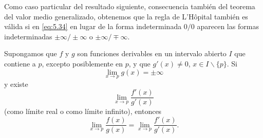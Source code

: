 \documentclass[12pt,a4paper]{book}
\begin{document}
    Como caso particular del resultado siguiente, consecuencia también del
    teorema del valor medio generalizado, obtenemos que la regla de L'Hôpital
    también es válida si en \eqref{eq:5.34} en lugar de la forma indeterminada $0/0$ aparecen
    las formas indeterminadas $\pm\infty/\pm\infty$ o $\pm\infty/\mp\infty$.

    \begin{proposicion}\label{prop:68}
        Supongamos que $f$ y $g$ son funciones derivables en un intervalo
        abierto $I$ que contiene a $p$, excepto posiblemente en $p$, y que $g'(x)\neq 0$,
        $x\in I\backslash\{p\}$. Si
        \begin{equation}\label{eq:5.38}
            \lim_{x\to p}g(x)=\pm\infty
        \end{equation}
        y existe
        \begin{equation}\label{eq:5.39}
            \lim_{x\to p}\frac{f'(x)}{g'(x)}
        \end{equation}
        (como límite real o como límite infinito), entonces
        \begin{equation}\label{eq:5.40}
            \lim_{x\to p}\frac{f(x)}{g(x)}=\lim_{x\to p}\frac{f'(x)}{g'(x)}.
        \end{equation}
    \end{proposicion}
\end{document}
